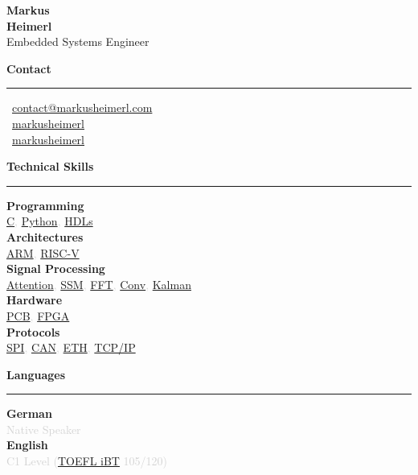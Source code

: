 \documentclass[a4paper,10pt]{article}
\newcommand{\cvsection}[1]{
    \vspace{12pt}
    {\large\bfseries\color{darkgray} #1}
    \vspace{4pt}
    \hrule
    \vspace{8pt}
}
\newcommand{\cvitem}[2]{
    \textbf{\color{darkgray}#1} \\
    \textcolor{lightgray}{\small #2} \\[2pt]
}
\newcommand{\cvitemlast}[2]{
    \textbf{\color{darkgray}#1} \\
    \textcolor{lightgray}{\small #2}
}
\begin{document}
\setlength{\columnsep}{0.8cm}
\begin{paracol}{2}


\vspace{0.5cm}

\begin{center}
    {\LARGE\bfseries\color{darkgray} Markus} \\[4pt]
    {\LARGE\bfseries\color{primaryblue} Heimerl} \\[8pt]
    {\small\color{darkgray} Embedded Systems Engineer}
\end{center}

\vspace{0.6cm}

\cvsection{Contact}
\small
\faEnvelope\, \href{mailto:contact@markusheimerl.com}{contact@markusheimerl.com} \\[5pt]
\faLinkedin\, \href{https://www.linkedin.com/in/markusheimerl/}{markusheimerl} \\[5pt]
\faGithub\, \href{https://github.com/markusheimerl}{markusheimerl}

\cvsection{Technical Skills}
\cvitem{Programming}{\href{https://en.wikipedia.org/wiki/C_(programming_language)}{C}, \href{https://en.wikipedia.org/wiki/Python_(programming_language)}{Python}, \href{https://en.wikipedia.org/wiki/Hardware_description_language}{HDLs}}
\cvitem{Architectures}{\href{https://en.wikipedia.org/wiki/ARM_architecture_family}{ARM}, \href{https://en.wikipedia.org/wiki/RISC-V}{RISC-V}}
\cvitem{Signal Processing}{\href{https://en.wikipedia.org/wiki/Attention_(machine_learning)}{Attention}, \href{https://en.wikipedia.org/wiki/State-space_representation}{SSM}, \href{https://en.wikipedia.org/wiki/Fast_Fourier_transform}{FFT}, \href{https://en.wikipedia.org/wiki/Convolution}{Conv}, \href{https://en.wikipedia.org/wiki/Kalman_filter}{Kalman}}
\cvitem{Hardware}{\href{https://en.wikipedia.org/wiki/Printed_circuit_board}{PCB}, \href{https://en.wikipedia.org/wiki/Field-programmable_gate_array}{FPGA}}
\cvitemlast{Protocols}{\href{https://en.wikipedia.org/wiki/Serial_Peripheral_Interface}{SPI}, \href{https://en.wikipedia.org/wiki/CAN_bus}{CAN}, \href{https://en.wikipedia.org/wiki/Ethernet}{ETH}, \href{https://en.wikipedia.org/wiki/Internet_protocol_suite}{TCP/IP}}

\cvsection{Languages}
\cvitem{German}{Native Speaker}
\cvitemlast{English}{C1 Level (\href{https://www.ets.org/toefl.html}{TOEFL iBT} 105/120)}


\end{paracol}
\end{document}
